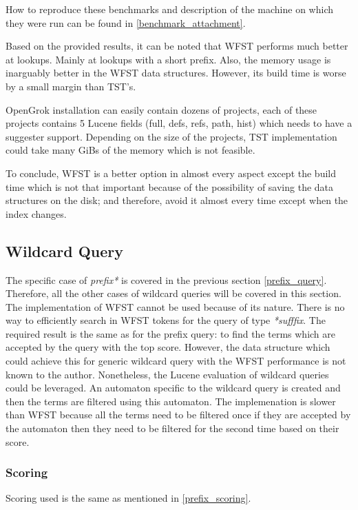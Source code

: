 How to reproduce these benchmarks and description of the machine on which they were run can be found in \ref{benchmark_attachment}.

Based on the provided results, it can be noted that WFST performs much better at lookups. Mainly at lookups with a short prefix.
Also, the memory usage is inarguably better in the WFST data structures. However, its build time is worse by a small margin than TST's.

OpenGrok installation can easily contain dozens of projects, each of these projects contains 5 Lucene fields
(full, defs, refs, path, hist) which needs to have a suggester support. Depending on the size of the projects,
TST implementation could take many GiBs of the memory which is not feasible.

To conclude, WFST is a better option in almost every aspect except the build time which is not that important because of
the possibility of saving the data structures on the disk; and therefore, avoid it almost every time except when the index changes.

\subsection{Wildcard Query}
\label{wildcard_query}
The specific case of \textit{prefix*} is covered in the previous section \ref{prefix_query}. Therefore,
all the other cases of wildcard queries will be covered in this section.
The implementation of WFST cannot be used because of its nature.
There is no way to efficiently search in WFST tokens for the query of type \textit{*sufffix}. The required result is
the same as for the prefix query: to find the terms which are accepted by the query with the top score. However, the data
structure which could achieve this for generic wildcard query with the WFST performance is not known to the author.
Nonetheless, the Lucene evaluation of wildcard queries could be leveraged. An automaton specific to the wildcard query is
created and then the terms are filtered using this automaton. The implemenation is slower than WFST because all the terms
need to be filtered once if they are accepted by the automaton then they need to be filtered for the second time based on
their score.

\subsubsection{Scoring}
Scoring used is the same as mentioned in \ref{prefix_scoring}.

